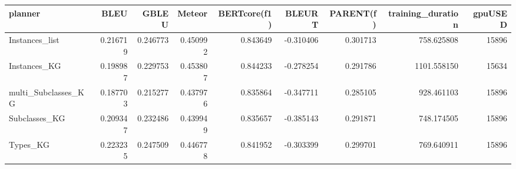 \begin{tabular}{lrrrrrrrr}
\toprule
            planner &     BLEU &    GBLEU &   Meteor &  BERTcore(f1) &    BLEURT &  PARENT(f) &  training\_duration &  gpuUSED \\
\midrule
     Instances\_list & 0.216719 & 0.246773 & 0.450992 &      0.843649 & -0.310406 &   0.301713 &         758.625808 &    15896 \\
       Instances\_KG & 0.198987 & 0.229753 & 0.453807 &      0.844233 & -0.278254 &   0.291786 &        1101.558150 &    15634 \\
multi\_Subclasses\_KG & 0.187703 & 0.215277 & 0.437976 &      0.835864 & -0.347711 &   0.285105 &         928.461103 &    15896 \\
      Subclasses\_KG & 0.209347 & 0.232486 & 0.439949 &      0.835657 & -0.385143 &   0.291871 &         748.174505 &    15896 \\
           Types\_KG & 0.223235 & 0.247509 & 0.446778 &      0.841952 & -0.303399 &   0.299701 &         769.640911 &    15896 \\
\bottomrule
\end{tabular}
